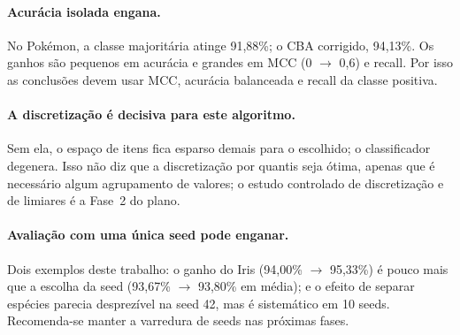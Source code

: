 \documentclass[a4paper,11pt]{article}
\newcommand{\code}[1]{\texttt{\detokenize{#1}}}
\begin{document}
\paragraph{Acur\'acia isolada engana.} No Pok\'emon, a classe majorit\'aria atinge 91,88\%; o CBA corrigido, 94,13\%. Os ganhos s\~ao pequenos em acur\'acia e grandes em MCC (0 $\to$ 0,6) e recall. Por isso as conclus\~oes devem usar MCC, acur\'acia balanceada e recall da classe positiva.

\paragraph{A discretiza\c{c}\~ao \'e decisiva para este algoritmo.} Sem ela, o espa\c{c}o de itens fica esparso demais para o \code{min_support} escolhido; o classificador degenera. Isso n\~ao diz que a discretiza\c{c}\~ao por quantis seja \'otima, apenas que \'e necess\'ario algum agrupamento de valores; o estudo controlado de discretiza\c{c}\~ao e de limiares \'e a Fase~2 do plano.

\paragraph{Avalia\c{c}\~ao com uma \'unica seed pode enganar.} Dois exemplos deste trabalho: o ganho do Iris (94,00\% $\to$ 95,33\%) \'e pouco mais que a escolha da seed (93,67\% $\to$ 93,80\% em m\'edia); e o efeito de separar esp\'ecies parecia desprez\'ivel na seed 42, mas \'e sistem\'atico em 10 seeds. Recomenda-se manter a varredura de seeds nas pr\'oximas fases.
\end{document}
